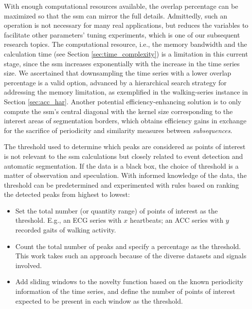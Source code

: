 With enough computational resources available, the overlap percentage can be maximized so that the \gls{ssm} can mirror the full details. Admittedly, such an operation is not necessary for many real applications, but reduces the variables to facilitate other parameters' tuning experiments, which is one of our subsequent research topics.
The computational resource, i.e., the memory bandwidth and the calculation time (see Section \ref{sec:time_complexity}) is a limitation in this current stage, since the \gls{ssm} increases exponentially with the increase in the time series size. We ascertained that downsampling the time series with a lower overlap percentage is a valid option, advanced by a hierarchical search strategy for addressing the memory limitation, as exemplified in the walking-series instance in Section \ref{sec:acc_har}. Another potential efficiency-enhancing solution is to only compute the \gls{ssm}'s central diagonal with the kernel size corresponding to the interest areas of segmentation borders, which obtains efficiency gains in exchange for the sacrifice of periodicity and similarity measures between \textit{subsequences}.

The threshold used to determine which peaks are considered as points of interest is not relevant to the \gls{ssm} calculations but closely related to event detection and automatic segmentation. If the data is a black box, the choice of threshold is a matter of observation and speculation. With informed knowledge of the data, the threshold can be predetermined and experimented with rules based on ranking the detected peaks from highest to lowest:

\begin{itemize}
    \item Set the total number (or quantity range) of points of interest as the threshold. E.g., an ECG series with $x$ heartbeats; an ACC series with $y$ recorded gaits of walking activity.
    \item Count the total number of peaks and specify a percentage as the threshold. This work takes such an approach because of the diverse datasets and signals involved.
    \item Add sliding windows to the novelty function based on the known periodicity information of the time series, and define the number of points of interest expected to be present in each window as the threshold.
\end{itemize}








